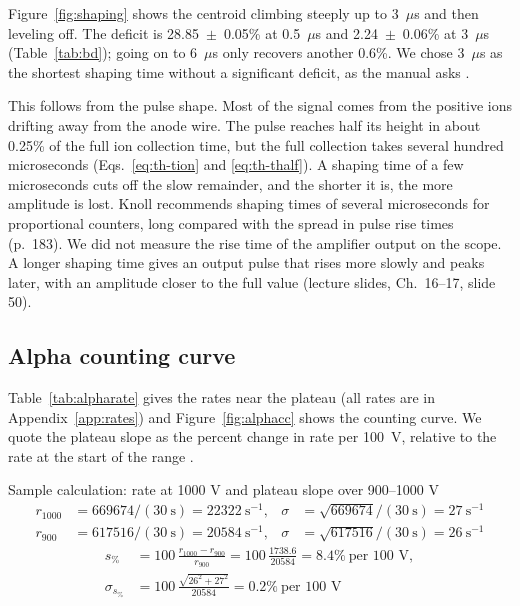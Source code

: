 \documentclass[12pt]{article}
\begin{document}
Figure~\ref{fig:shaping} shows the centroid climbing steeply up to 3~$\mu$s and then leveling off. The deficit is 28.85~$\pm$~0.05\% at 0.5~$\mu$s and 2.24~$\pm$~0.06\% at 3~$\mu$s (Table~\ref{tab:bd}); going on to 6~$\mu$s only recovers another 0.6\%. We chose 3~$\mu$s as the shortest shaping time without a significant deficit, as the manual asks \cite{labmanual}.

This follows from the pulse shape. Most of the signal comes from the positive ions drifting away from the anode wire. The pulse reaches half its height in about 0.25\% of the full ion collection time, but the full collection takes several hundred microseconds (Eqs.~\ref{eq:th-tion} and \ref{eq:th-thalf}). A shaping time of a few microseconds cuts off the slow remainder, and the shorter it is, the more amplitude is lost. Knoll recommends shaping times of several microseconds for proportional counters, long compared with the spread in pulse rise times (p.~183). We did not measure the rise time of the amplifier output on the scope. A longer shaping time gives an output pulse that rises more slowly and peaks later, with an amplitude closer to the full value (lecture slides, Ch.~16--17, slide 50).

\subsection{Alpha counting curve}

Table~\ref{tab:alpharate} gives the rates near the plateau (all rates are in Appendix~\ref{app:rates}) and Figure~\ref{fig:alphacc} shows the counting curve. We quote the plateau slope as the percent change in rate per 100~V, relative to the rate at the start of the range \cite{knoll}.

\begin{samplecalc}{Sample calculation: rate at 1000 V and plateau slope over 900--1000 V}
\begin{align*}
r_{1000} &= 669674/(30\ \text{s}) = 22322\ \text{s}^{-1}, & \sigma &= \sqrt{669674}/(30\ \text{s}) = 27\ \text{s}^{-1}\\
r_{900} &= 617516/(30\ \text{s}) = 20584\ \text{s}^{-1}, & \sigma &= \sqrt{617516}/(30\ \text{s}) = 26\ \text{s}^{-1}
\end{align*}
\begin{align*}
s_{\%} &= 100\,\frac{r_{1000} - r_{900}}{r_{900}} = 100\,\frac{1738.6}{20584} = 8.4\%\ \text{per 100 V},\\
\sigma_{s_\%} &= 100\,\frac{\sqrt{26^2 + 27^2}}{20584} = 0.2\%\ \text{per 100 V}
\end{align*}
\end{samplecalc}
\end{document}
